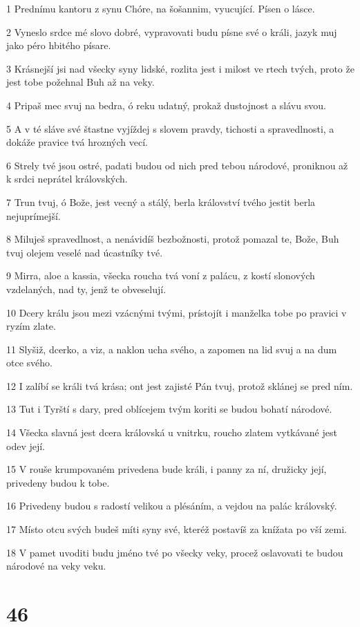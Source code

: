 \par 1 Prednímu kantoru z synu Chóre, na šošannim, vyucující. Písen o lásce.
\par 2 Vyneslo srdce mé slovo dobré, vypravovati budu písne své o králi, jazyk muj jako péro hbitého písare.
\par 3 Krásnejší jsi nad všecky syny lidské, rozlita jest i milost ve rtech tvých, proto že jest tobe požehnal Buh až na veky.
\par 4 Pripaš mec svuj na bedra, ó reku udatný, prokaž dustojnost a slávu svou.
\par 5 A v té sláve své štastne vyjíždej s slovem pravdy, tichosti a spravedlnosti, a dokáže pravice tvá hrozných vecí.
\par 6 Strely tvé jsou ostré, padati budou od nich pred tebou národové, proniknou až k srdci neprátel královských.
\par 7 Trun tvuj, ó Bože, jest vecný a stálý, berla království tvého jestit berla nejuprímejší.
\par 8 Miluješ spravedlnost, a nenávidíš bezbožnosti, protož pomazal te, Bože, Buh tvuj olejem veselé nad úcastníky tvé.
\par 9 Mirra, aloe a kassia, všecka roucha tvá voní z palácu, z kostí slonových vzdelaných, nad ty, jenž te obveselují.
\par 10 Dcery králu jsou mezi vzácnými tvými, prístojít i manželka tobe po pravici v ryzím zlate.
\par 11 Slyšiž, dcerko, a viz, a naklon ucha svého, a zapomen na lid svuj a na dum otce svého.
\par 12 I zalíbí se králi tvá krása; ont jest zajisté Pán tvuj, protož sklánej se pred ním.
\par 13 Tut i Tyrští s dary, pred oblícejem tvým koriti se budou bohatí národové.
\par 14 Všecka slavná jest dcera královská u vnitrku, roucho zlatem vytkávané jest odev její.
\par 15 V rouše krumpovaném privedena bude králi, i panny za ní, družicky její, privedeny budou k tobe.
\par 16 Privedeny budou s radostí velikou a plésáním, a vejdou na palác královský.
\par 17 Místo otcu svých budeš míti syny své, kteréž postavíš za knížata po vší zemi.
\par 18 V pamet uvoditi budu jméno tvé po všecky veky, procež oslavovati te budou národové na veky veku.

\chapter{46}

